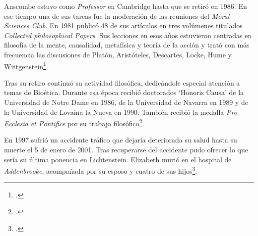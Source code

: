 Anscombe estuvo como \emph{Professor} en Cambridge hasta que se retiró en 1986. En ese tiempo una de sus tareas fue la moderación de las reuniones del \emph{Moral Sciences Club}. En 1981 publicó 48 de sus artículos en tres volúmenes titulados \emph{Collected philosophical Papers}. Sus lecciones en esos años estuvieron centradas en filosofía de la mente, causalidad, metafísica y teoría de la acción y trató con más frecuencia las discusiones de Platón, Aristóteles, Descartes, Locke, Hume y Wittgenstein\footcite[Cf.][46]{torralba2005accion}.

Tras su retiro continuó su actividad filosófica, dedicándole especial atención a temas de Bioética. Durante esa época recibió doctorados `Honoris Causa' de la Universidad de Notre Dame en 1986, de la Universidad de Navarra en 1989 y de la Universidad de Lovaina la Nueva en 1990. También recibió la medalla \emph{Pro Ecclesia et Pontifice} por su trabajo filosófico\footcite[Cf.][48]{torralba2005accion}.

En 1997 sufrió un accidente tráfico que dejaría deteriorada su salud hasta su muerte el 5 de enero de 2001. Tras recuperarse del accidente pudo ofrecer lo que sería su última ponencia en Lichtenstein. Elizabeth murió en el hospital de \emph{Addenbrooke}, acompañada por su esposo y cuatro de sus hijos\footcite[Cf.][50]{teichman2002fellows}.
